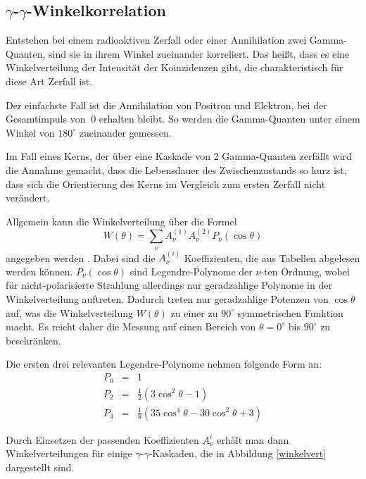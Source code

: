 \documentclass[11pt]{scrartcl}
\begin{document}
\subsection{$\gamma$-$\gamma$-Winkelkorrelation}
Entstehen bei einem radioaktiven Zerfall oder einer Annihilation zwei Gamma-Quanten, sind sie
in ihrem Winkel zueinander korreliert. Das heißt, dass es eine Winkelverteilung der Intensität
der Koinzidenzen gibt, die charakteristisch für diese Art Zerfall ist. 

Der einfachste Fall ist die Annihilation von Positron und Elektron, bei der Gesamtimpuls von $~0$ 
erhalten bleibt. So werden die Gamma-Quanten unter einem Winkel von $180^\circ$ zueinander gemessen.

Im Fall eines Kerns, der über eine Kaskade von 2 Gamma-Quanten zerfällt wird die Annahme gemacht, dass
die Lebensdauer des Zwischenzustands so kurz ist, dass sich die Orientierung des Kerns im Vergleich 
zum ersten Zerfall nicht verändert. 

Allgemein kann die Winkelverteilung über die Formel
\begin{equation}
 W(\theta)=\sum_\nu A_\nu^{(1)} A_\nu^{(2)} P_\nu ( \cos \theta)
\end{equation}
angegeben werden \cite{grundlagen}. Dabei sind die $A_\nu^{(i)}$ Koeffizienten, die aus Tabellen abgelesen werden können.
$P_\nu(\cos \theta)$ sind Legendre-Polynome der $\nu$-ten Ordnung, wobei für nicht-polarisierte Strahlung
allerdings nur geradzahlige Polynome in der Winkelverteilung auftreten. Dadurch treten nur geradzahlige
Potenzen von $\cos \theta$ auf, was die Winkelverteilung $W(\theta)$ zu einer zu $90^\circ$ symmetrischen
Funktion macht. Es reicht daher die Messung auf einen Bereich von $\theta=0^\circ$ bis $90^\circ$ zu 
beschränken.

Die ersten drei relevanten Legendre-Polynome nehmen folgende Form an:
\begin{eqnarray}
 P_0 &=&1\\
 P_2 & = & \frac{1}{2}(3 \cos^2 \theta - 1)\\
 P_4 &=& \frac{1}{8}(35\cos^4 \theta - 30 \cos^2 \theta +3)
\end{eqnarray}

Durch Einsetzen der passenden Koeffizienten $A_\nu^{i}$ erhält man dann Winkelverteilungen für
einige $\gamma$-$\gamma$-Kaskaden, die in Abbildung \ref{winkelvert} dargestellt sind.
\end{document}
